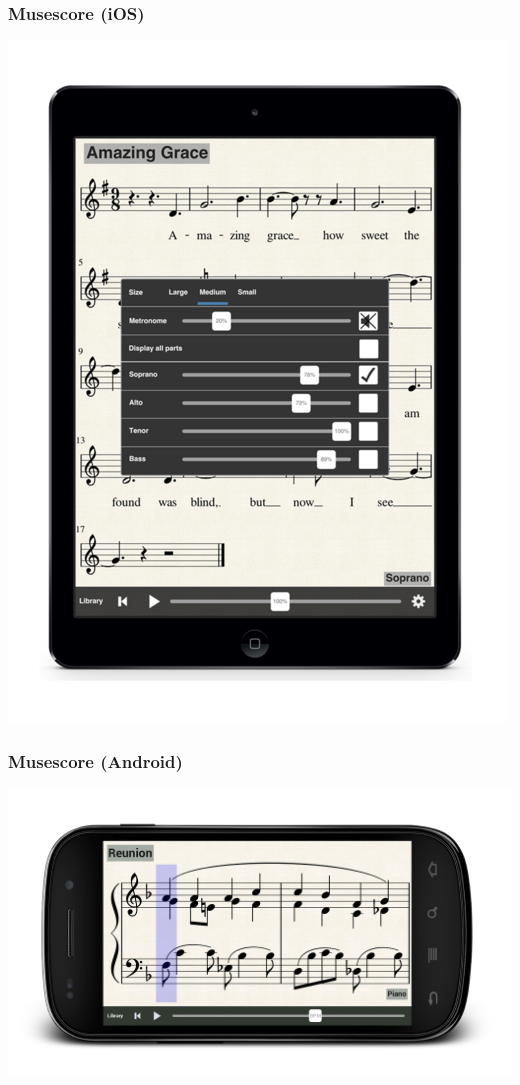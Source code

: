 \begin{frame}
  \frametitle{Musescore (iOS)}
  \center
  \includegraphics[height=0.9\textheight]{apps_musescore_ios}
\end{frame}

\begin{frame}
  \frametitle{Musescore (Android)}
  \includegraphics[width=\textwidth]{apps_musescore_android}
\end{frame}

